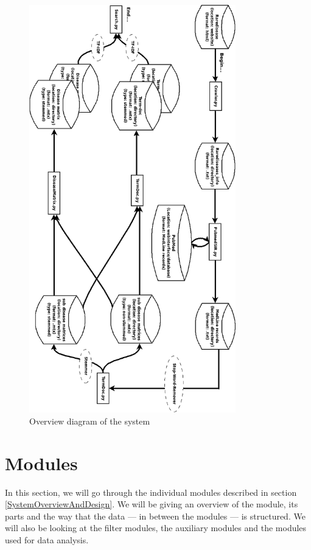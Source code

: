 \begin{figure}[H]
        \begin{center}
          \includegraphics[width=0.8\textwidth]{diagrammer/system_overview_rotate.png}
        \end{center}
        \caption{Overview diagram of the system}
        \label{OverviewDiagram}
\end{figure}

\section{Modules}

In this section, we will go through the individual modules described
in section \ref{SystemOverviewAndDesign}. We will be giving an
overview of the module, its parts and the way that the data --- in
between the modules --- is structured. We will also be looking at the
filter modules, the auxiliary modules and the modules used for data
analysis.


